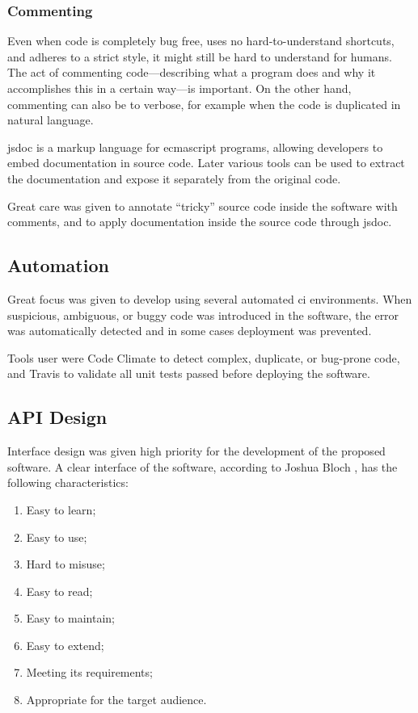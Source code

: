 \begin{enumerate}
\subsubsection{Commenting}\label{commenting}

Even when code is completely bug free, uses no hard-to-understand
shortcuts, and adheres to a strict style, it might still be hard to
understand for humans. The act of commenting code---describing what a
program does and why it accomplishes this in a certain way---is
important. On the other hand, commenting can also be to verbose, for
example when the code is duplicated in natural language.

\Gls{jsdoc} \autocite{google.com-clojure-compiler-jsdoc} is a markup
language for \gls{ecmascript} programs, allowing developers to embed
documentation in source code. Later various tools can be used to extract
the documentation and expose it separately from the original code.

Great care was given to annotate ``tricky'' source code inside the
software with comments, and to apply documentation inside the source
code through \gls{jsdoc}.

\subsection{Automation}\label{automation}

Great focus was given to develop using several automated \gls{ci}
environments. When suspicious, ambiguous, or buggy code was introduced
in the software, the error was automatically detected and in some cases
deployment was prevented.

Tools user were Code Climate \autocite{codeclimate.com} to detect
complex, duplicate, or bug-prone code, and Travis
\autocite{travis-ci.org} to validate all unit tests passed before
deploying the software.

\subsection{API Design}\label{design-1}

Interface design was given high priority for the development of the
proposed software. A clear interface of the software, according to
Joshua Bloch \autocite*{bloch-joshua-how-design-good-api-why-matters},
has the following characteristics:

\begin{enumerate}
\item
  Easy to learn;
\item
  Easy to use;
\item
  Hard to misuse;
\item
  Easy to read;
\item
  Easy to maintain;
\item
  Easy to extend;
\item
  Meeting its requirements;
\item
  Appropriate for the target audience.
\end{enumerate}


\end{enumerate}
